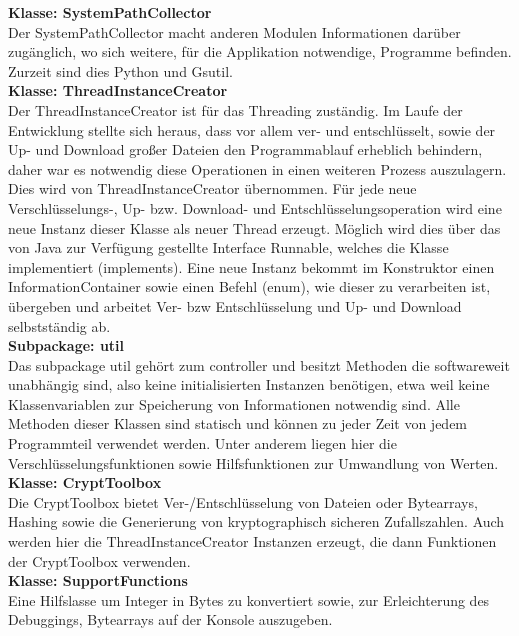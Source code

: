 \documentclass[12pt,a4paper,bibliography=totocnumbered,listof=totocnumbered]{scrartcl}
\begin{document}
\textbf{Klasse: SystemPathCollector}\\
Der SystemPathCollector macht anderen Modulen Informationen darüber zugänglich, wo sich weitere, für die Applikation notwendige, Programme befinden. Zurzeit sind dies Python und Gsutil.\\
\textbf{Klasse: ThreadInstanceCreator}\\
Der ThreadInstanceCreator ist für das Threading zuständig. Im Laufe der Entwicklung stellte sich heraus, dass vor allem ver- und entschlüsselt, sowie der Up- und Download großer Dateien den Programmablauf erheblich behindern, daher war es notwendig diese Operationen in einen weiteren Prozess auszulagern. Dies wird von ThreadInstanceCreator übernommen. Für jede neue Verschlüsselungs-, Up- bzw. Download- und Entschlüsselungsoperation wird eine neue Instanz dieser Klasse als neuer Thread erzeugt. Möglich wird dies über das von Java zur Verfügung gestellte Interface Runnable, welches die Klasse implementiert (implements). Eine neue Instanz bekommt im Konstruktor einen InformationContainer sowie einen Befehl (enum), wie dieser zu verarbeiten ist, übergeben und arbeitet Ver- bzw Entschlüsselung und Up- und Download selbstständig ab.\\
\textbf{Subpackage: util}\\
Das subpackage util gehört zum controller und besitzt Methoden die softwareweit unabhängig sind, also keine initialisierten Instanzen benötigen, etwa weil keine Klassenvariablen zur Speicherung von Informationen notwendig sind. Alle Methoden dieser Klassen sind statisch und können zu jeder Zeit von jedem Programmteil verwendet werden. Unter anderem liegen hier die Verschlüsselungsfunktionen sowie Hilfsfunktionen zur Umwandlung von Werten. \\
\textbf{Klasse: CryptToolbox}\\
Die CryptToolbox bietet Ver-/Entschlüsselung von Dateien oder Bytearrays, Hashing sowie die Generierung von kryptographisch sicheren Zufallszahlen. Auch werden hier die ThreadInstanceCreator Instanzen erzeugt, die dann Funktionen der CryptToolbox verwenden.\\
\textbf{Klasse: SupportFunctions}\\
Eine Hilfslasse um Integer in Bytes zu konvertiert sowie, zur Erleichterung des Debuggings, Bytearrays auf der Konsole auszugeben.\\
\end{document}
